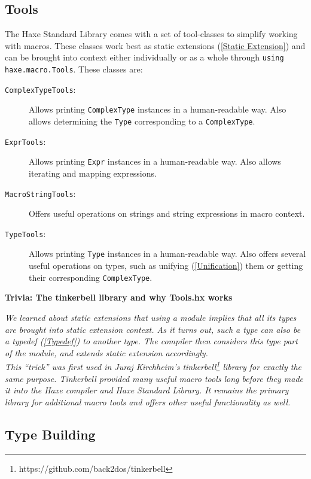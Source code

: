 \documentclass{article}
\newcommand{\type}[1]{\texttt{#1}}
\newcommand{\expr}[1]{\texttt{#1}}
\newenvironment{myshaded}
  {\def\FrameCommand{\fboxsep=\topsep\colorbox{bgcolor}}%
  \MakeFramed {\advance\hsize-\width \FrameRestore}}%
 {\endMakeFramed}
\newcommand{\trivia}[2]
	{\begin{myshaded}\noindent\textbf{Trivia: #1}\par\nobreak\noindent\ignorespaces\textit{#2}\end{myshaded}}
\newcommand{\tref}[2]{#1 (\ref{#2})}
\begin{document}
\subsection{Tools}
\label{Macro Tools}

The Haxe Standard Library comes with a set of tool-classes to simplify working with macros. These classes work best as \tref{static extensions}{Static Extension} and can be brought into context either individually or as a whole through \expr{using haxe.macro.Tools}. These classes are:

\begin{description}
	\item[\type{ComplexTypeTools}:] Allows printing \type{ComplexType} instances in a human-readable way. Also allows determining the \type{Type} corresponding to a \type{ComplexType}.
	\item[\type{ExprTools}:] Allows printing \type{Expr} instances in a human-readable way. Also allows iterating and mapping expressions.
	\item[\type{MacroStringTools}:] Offers useful operations on strings and string expressions in macro context.
	\item[\type{TypeTools}:] Allows printing \type{Type} instances in a human-readable way. Also offers several useful operations on types, such as \tref{unifying}{Unification} them or getting their corresponding \type{ComplexType}.
\end{description}

\trivia{The tinkerbell library and why Tools.hx works}{We learned about static extensions that using a \emph{module} implies that all its types are brought into static extension context. As it turns out, such a type can also be a \tref{typedef}{Typedef} to another type. The compiler then considers this type part of the module, and extends static extension accordingly.\\
This ``trick'' was first used in Juraj Kirchheim's \emph{tinkerbell}\footnote{https://github.com/back2dos/tinkerbell} library for exactly the same purpose. Tinkerbell provided many useful macro tools long before they made it into the Haxe compiler and Haxe Standard Library. It remains the primary library for additional macro tools and offers other useful functionality as well.} 



\subsection{Type Building}
\label{Type Building}
\end{document}
